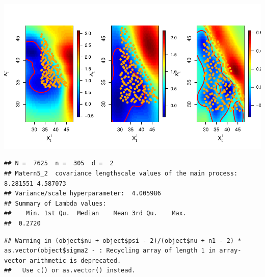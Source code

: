 \documentclass[]{article}
\newenvironment{Shaded}{\begin{snugshade}}{\end{snugshade}}
\newcommand{\KeywordTok}[1]{\textcolor[rgb]{0.13,0.29,0.53}{\textbf{#1}}}
\newcommand{\DataTypeTok}[1]{\textcolor[rgb]{0.13,0.29,0.53}{#1}}
\newcommand{\DecValTok}[1]{\textcolor[rgb]{0.00,0.00,0.81}{#1}}
\newcommand{\StringTok}[1]{\textcolor[rgb]{0.31,0.60,0.02}{#1}}
\newcommand{\OperatorTok}[1]{\textcolor[rgb]{0.81,0.36,0.00}{\textbf{#1}}}
\newcommand{\NormalTok}[1]{#1}
\begin{document}
\begin{center}\includegraphics{figures/hetGP-2D-1} \end{center}

\begin{Shaded}
\end{Shaded}

\begin{verbatim}
## N =  7625  n =  305  d =  2
## Matern5_2  covariance lengthscale values of the main process:  8.281551 4.587073
## Variance/scale hyperparameter:  4.005986
## Summary of Lambda values:
##    Min. 1st Qu.  Median    Mean 3rd Qu.    Max.
##  0.2720  

\end{verbatim}

\begin{Shaded}
\end{Shaded}

\begin{verbatim}
## Warning in (object$nu + object$psi - 2)/(object$nu + n1 - 2) * as.vector(object$sigma2 - : Recycling array of length 1 in array-vector arithmetic is deprecated.
##   Use c() or as.vector() instead.
\end{verbatim}
\end{document}
